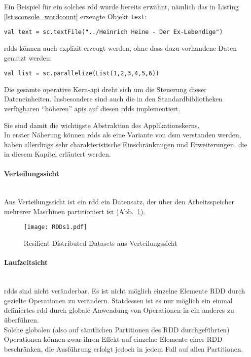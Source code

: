 Ein Beispiel für ein solches \gls{rdd} wurde bereits erwähnt, nämlich das in Listing \ref{lst:sconsole_wordcount} erzeugte Objekt \lstinline|text|:\\

\begin{lstlisting}
val text = sc.textFile("../Heinrich Heine - Der Ex-Lebendige")
\end{lstlisting}

\Glspl{rdd} können auch explizit erzeugt werden, ohne dass dazu vorhandene Daten genutzt werden:\\

\begin{lstlisting}
val list = sc.parallelize(List(1,2,3,4,5,6))
\end{lstlisting}

Die gesamte operative Kern-\gls{api} dreht sich um die Steuerung dieser Dateneinheiten. Insbesondere sind auch die in den Standardbibliotheken verfügbaren "`höheren"' \glspl{api} auf diesen \glspl{rdd} implementiert.

Sie sind damit die wichtigste Abstraktion des Applikationskerns.\\

In erster Näherung können \glspl{rdd} als eine Variante von \gls{dsm}\cite{Nitzberg:1991:DSM:112827.112855} \cite{Mat12} verstanden werden, haben allerdings sehr charakteristische Einschränkungen und Erweiterungen, die in diesem Kapitel erläutert werden.\\

\paragraph{Verteilungssicht}\\

Aus Verteilungssicht ist ein \gls{rdd} ein Datensatz, der über den Arbeitsspeicher mehrerer Maschinen partitioniert ist (Abb.~\ref{fig:rdds1}).

\begin{figure}[ht!]
	\centering
  \texttt{[image: RDDs1.pdf]}
	\caption{Resilient Distributed Datasets aus Verteilungssicht}
	\label{fig:rdds1}
\end{figure}

\paragraph{Laufzeitsicht}\\

\Glspl{rdd} sind nicht veränderbar. Es ist nicht möglich einzelne Elemente \gls{RDD} durch gezielte Operationen zu verändern. Statdessen ist es nur möglich ein einmal definiertes \gls{rdd} durch globale Anwendung von Operationen in ein anderes zu überführen.\\
Solche globalen (also auf sämtlichen Partitionen des \gls{RDD} durchgeführten) Operationen können zwar ihren Effekt auf einzelne Elemente eines \gls{RDD} beschränken, die Ausführung erfolgt jedoch in jedem Fall auf allen Partitionen.\\

